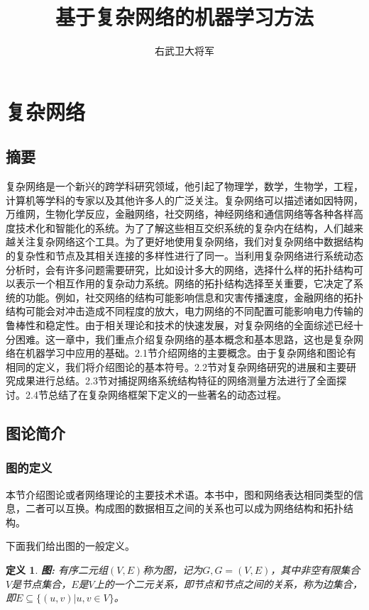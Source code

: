 \documentclass{ctexart}
\author{右武卫大将军}
\title{基于复杂网络的机器学习方法}
\newtheorem{Definition}{\hspace{2em}定义}[section]
\begin{document}
    \maketitle
    \section{复杂网络}
        \subsection{摘要}
            复杂网络是一个新兴的跨学科研究领域，他引起了物理学，数学，生物学，工程，计算机等学科的专家以及其他许多人的广泛关注。复杂网络可以描述诸如因特网，万维网，生物化学反应，金融网络，社交网络，神经网络和通信网络等各种各样高度技术化和智能化的系统。为了了解这些相互交织系统的复杂内在结构，人们越来越关注复杂网络这个工具。为了更好地使用复杂网络，我们对复杂网络中数据结构的复杂性和节点及其相关连接的多样性进行了同一。当利用复杂网络进行系统动态分析时，会有许多问题需要研究，比如设计多大的网络，选择什么样的拓扑结构可以表示一个相互作用的复杂动力系统。网络的拓扑结构选择至关重要，它决定了系统的功能。例如，社交网络的结构可能影响信息和灾害传播速度，金融网络的拓扑结构可能会对冲击造成不同程度的放大，电力网络的不同配置可能影响电力传输的鲁棒性和稳定性。由于相关理论和技术的快速发展，对复杂网络的全面综述已经十分困难。这一章中，我们重点介绍复杂网络的基本概念和基本思路，这也是复杂网络在机器学习中应用的基础。2.1节介绍网络的主要概念。由于复杂网络和图论有相同的定义，我们将介绍图论的基本符号。2.2节对复杂网络研究的进展和主要研究成果进行总结。2.3节对捕捉网络系统结构特征的网络测量方法进行了全面探讨。2.4节总结了在复杂网络框架下定义的一些著名的动态过程。

        \subsection{图论简介}
            \subsubsection{图的定义}
                本节介绍图论或者网络理论的主要技术术语。本书中，图和网络表达相同类型的信息，二者可以互换。构成图的数据相互之间的关系也可以成为网络结构和拓扑结构。

                下面我们给出图的一般定义。
                \begin{Definition}
                    \textbf{图:} 有序二元组$(V,E)$称为图，记为$G,G=(V,E)$，其中非空有限集合$V$是节点集合，$E$是$V$上的一个二元关系，即节点和节点之间的关系，称为边集合，即$E \subseteq \{(u,v)|u,v\in V\}$。
                \end{Definition}
\end{document}
